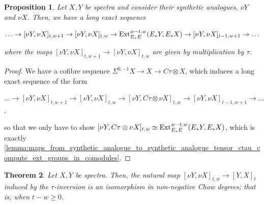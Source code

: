 \documentclass[oneside,a4paper]{amsart}
\theoremstyle{plain}
\newtheorem{thm}{Theorem}[section]
\newtheorem{prop}[thm]{Proposition}
\theoremstyle{definition}
\theoremstyle{remark}
\begin{document}
\begin{prop}
\label{prop:long_exact_sequence_relating_synthetic_homotopy_with_ext_groups}
Let $X, Y$ be spectra and consider their synthetic analogues, $\nu Y$ and $\nu X$. Then, we have a long exact sequence

\begin{center}
$\ldots \rightarrow [\nu Y, \nu X]_{t, w+1} \rightarrow [\nu Y, \nu X]_{t, w} \rightarrow \textnormal{Ext}_{E_{*}E}^{w-t, w}(E_{*}Y, E_{*}X) \rightarrow [\nu Y, \nu X]_{t-1, w+1} \rightarrow \ldots$
\end{center}
where the maps $ [\nu Y, \nu X]_{t, w+1} \rightarrow [\nu Y, \nu X]_{t, w}$ are given by multiplication by $\tau$. 
\end{prop}

\begin{proof}
We have a cofibre sequence $\Sigma^{0, -1} X \rightarrow X \rightarrow C\tau \otimes X$, which induces a long exact sequence of the form 

\begin{center}
$\ldots \rightarrow [\nu Y, \nu X]_{t, w+1} \rightarrow [\nu Y, \nu X]_{t, w} \rightarrow [\nu Y, C\tau \otimes \nu X]_{t, w} \rightarrow [\nu Y, \nu X]_{t-1, w+1} \rightarrow \ldots$,
\end{center}
so that we only have to show $[\nu Y, C\tau \otimes \nu X]_{t, w} \simeq \textnormal{Ext}_{E_{*}E}^{w-t, w}(E_{*}Y, E_{*}X)$, which is exactly \cref{lemma:maps_from_synthetic_analogue_to_synthetic_analogue_tensor_ctau_compute_ext_groups_in_comodules}. 
\end{proof}

\begin{thm}
\label{thm:homotopy_of_synthetic_analogues_is_topological_in_non_negative_chow_degree}
Let $X, Y$ be spectra. Then, the natural map $[\nu Y, \nu X]_{t, w} \rightarrow [Y, X]_{t}$ induced by the $\tau$-inversion is an isomorphism in non-negative Chow degrees; that is, when $t - w \geq 0$. 
\end{thm}
\end{document}
